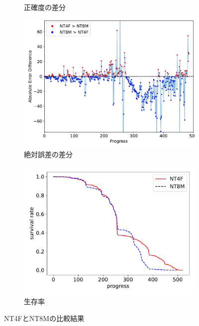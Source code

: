 \begin{figure}[t]
\begin{subfigure}[b]{0.49\linewidth}
    \caption{正確度の差分}
    \label{fig:NT4F_and_NT8M_acc_diff}
\end{subfigure}
\begin{subfigure}[b]{0.49\linewidth}
    \includegraphics[width=\linewidth]{pdf/compare/NT4F_and_NT8M/error_abs_diff_plot.pdf}
    \caption{絶対誤差の差分}
    \label{fig:NT4F_and_NT8M_error_abs_diff}
\end{subfigure}
\begin{subfigure}[b]{0.49\linewidth}
    \includegraphics[width=\linewidth]{pdf/compare/NT4F_and_NT8M/survival.pdf}
    \caption{生存率}
    \label{fig:NT4F_and_NT8M_survival}
\end{subfigure}
\caption{NT4FとNT8Mの比較結果}
\label{fig:NT4FとNT8M_results}
\end{figure}

